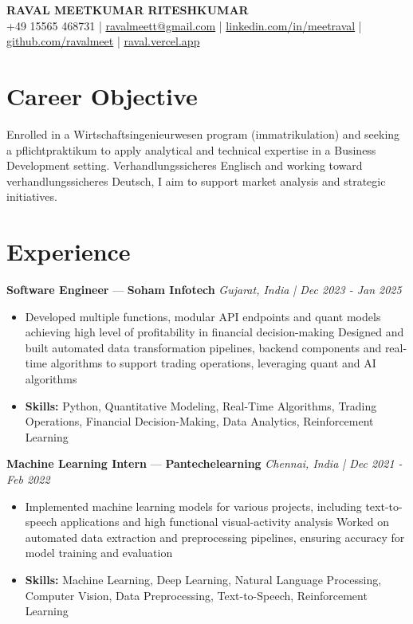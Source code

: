 \documentclass[a4paper,10pt]{article}
\begin{document}
\begin{center}
  {\Large\bfseries RAVAL MEETKUMAR RITESHKUMAR}\\[2pt]
  {\small +49 15565 468731 \;|\; \href{mailto:ravalmeett@gmail.com}{ravalmeett@gmail.com} \;|\; \href{https://www.linkedin.com/in/meetraval/}{linkedin.com/in/meetraval} \;|\; \href{https://github.com/ravalmeet}{github.com/ravalmeet} \;|\; \href{https://raval.vercel.app/}{raval.vercel.app}}
\end{center}
\vspace{-3pt}

\section*{Career Objective}
Enrolled in a Wirtschaftsingenieurwesen program (immatrikulation) and seeking a pflichtpraktikum to apply analytical and technical expertise in a Business Development setting. Verhandlungssicheres Englisch and working toward verhandlungssicheres Deutsch, I aim to support market analysis and strategic initiatives.\par

\section*{Experience}
\textbf{Software Engineer} — \textbf{Soham Infotech} \hfill \textit{Gujarat, India \;|\; Dec 2023 - Jan 2025}\par
\vspace{1pt}
\begin{itemize}
  \item Developed multiple functions, modular API endpoints and quant models achieving high level of profitability in financial decision-making Designed and built automated data transformation pipelines, backend components and real-time algorithms to support trading operations, leveraging quant and AI algorithms
  \item \textbf{Skills:} Python, Quantitative Modeling, Real-Time Algorithms, Trading Operations, Financial Decision-Making, Data Analytics, Reinforcement Learning
\end{itemize}
\vspace{3pt}
\textbf{Machine Learning Intern} — \textbf{Pantechelearning} \hfill \textit{Chennai, India \;|\; Dec 2021 - Feb 2022}\par
\vspace{1pt}
\begin{itemize}
  \item Implemented machine learning models for various projects, including text-to-speech applications and high functional visual-activity analysis Worked on automated data extraction and preprocessing pipelines, ensuring accuracy for model training and evaluation
  \item \textbf{Skills:} Machine Learning, Deep Learning, Natural Language Processing, Computer Vision, Data Preprocessing, Text-to-Speech, Reinforcement Learning
\end{itemize}
\end{document}
